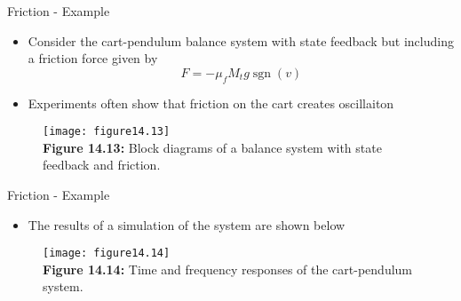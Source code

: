 \documentclass{beamer-control}
\begin{document}
\begin{frame}{Friction - Example}
	\begin{itemize}
		\item Consider the cart-pendulum balance system with state feedback but including a friction force given by
		\[F=-\mu_f M_t g \operatorname{sgn}(v)\]
		\item Experiments often show that friction on the cart creates oscillaiton
	\end{itemize}
	
\begin{figure}
	\vspace{-0.5cm}
	\centering
	\texttt{[image: figure14.13]}\\
	\vspace{-0.2cm}
	\textbf{Figure 14.13:} Block diagrams of a balance system with state feedback and friction.
\end{figure}
\end{frame}


\begin{frame}{Friction - Example}
	\begin{itemize}
		\item The results of a simulation of the system are shown below
	\end{itemize}
	
	\begin{figure}
		\vspace{-0.5cm}
		\centering
		\texttt{[image: figure14.14]}\\
		\vspace{-0.2cm}
		\textbf{Figure 14.14:} Time and frequency responses of the cart-pendulum system.
	\end{figure}
\end{frame}

\SUMMARYFRAME
\FINALE
\end{document}
